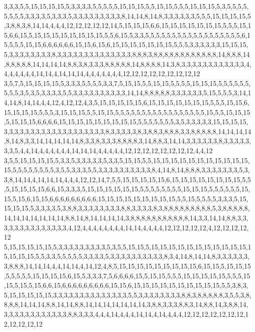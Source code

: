 3,3,3,5,5,15,15,15,15,5,3,3,3,3,5,5,5,5,5,15,15,15,5,5,15,15,5,5,5,15,15,15,5,3,5,5,5,5,5,5,5,5,3,3,3,3,5,3,3,3,5,3,3,3,3,3,3,3,3,3,8,14,14,8,14,8,3,3,3,3,3,3,5,5,5,15,15,15,15,5,3,8,8,3,8,14,14,4,4,4,12,12,12,12,12,14,5,15,15,15,6,6,15,15,15,15,15,15,15,5,5,5,15,15,6,6,15,5,15,15,15,15,15,15,15,15,5,5,6,15,5,3,3,5,5,5,5,5,5,5,5,5,5,5,5,5,5,5,5,5,5,6,15,5,5,5,15,15,6,6,6,6,6,6,15,15,6,15,6,15,15,15,15,15,15,15,5,5,5,3,3,3,3,3,3,15,15,15,5,3,3,3,3,3,3,3,3,8,3,3,3,3,3,3,3,3,3,3,3,3,3,3,8,8,8,3,8,8,8,8,8,8,8,8,8,8,8,8,14,8,8,8,14,8,8,8,8,8,14,14,14,14,8,8,3,8,3,3,3,8,8,8,8,8,14,8,8,8,8,14,3,8,3,3,3,3,3,3,3,3,3,3,3,3,4,4,4,4,4,4,4,14,14,4,14,14,14,4,4,4,4,4,4,4,12,12,12,12,12,12,12,12,12
3,5,7,5,15,15,15,15,5,3,3,3,5,5,5,5,3,3,7,5,15,15,5,5,15,15,5,5,5,5,15,15,15,5,5,5,5,5,5,5,5,5,3,5,3,5,3,3,3,3,5,5,3,3,3,3,3,3,3,3,3,3,14,14,8,8,8,8,8,3,3,3,3,3,3,5,15,5,5,5,3,14,14,14,8,14,14,4,4,12,4,12,12,4,3,5,15,15,15,15,15,6,15,15,15,15,15,15,15,5,5,5,15,15,6,15,15,15,15,5,5,5,3,15,15,15,5,5,15,15,5,5,5,5,5,5,5,5,5,5,5,5,5,5,5,5,5,15,5,5,15,15,15,5,15,15,15,6,6,6,6,15,15,15,15,15,15,15,15,15,5,5,5,5,5,5,5,3,5,3,3,3,3,3,15,15,15,15,3,3,3,3,3,3,3,3,3,3,3,3,3,3,3,3,3,3,3,8,3,3,3,3,3,8,3,8,8,3,8,8,8,3,3,8,8,8,8,8,14,14,14,14,8,14,8,3,3,14,14,14,14,14,8,3,3,8,3,3,3,8,8,8,8,3,14,8,8,3,14,14,3,3,3,3,3,3,8,3,3,3,3,3,3,3,5,4,4,14,4,4,4,4,4,4,14,14,14,4,4,4,4,4,12,12,12,12,12,12,12,12,4,4,12
3,5,5,15,15,15,15,5,3,3,5,3,3,3,3,3,5,3,3,5,15,15,5,5,15,15,15,15,15,15,15,15,15,15,15,15,5,5,5,5,5,5,5,5,3,5,5,3,3,3,5,5,3,3,3,3,3,3,3,3,3,3,8,4,14,8,14,8,8,8,3,3,3,3,3,3,3,5,3,3,8,14,14,4,14,14,14,4,4,4,12,12,14,7,5,5,15,15,15,15,15,6,15,15,15,15,15,15,15,15,5,5,5,15,15,15,15,6,6,15,3,3,3,5,15,15,15,15,15,15,5,5,5,5,5,5,5,5,15,15,15,5,5,5,5,5,5,15,15,5,15,6,15,15,6,6,6,6,6,6,6,6,6,15,15,15,15,15,15,15,15,15,5,5,15,5,5,5,5,3,3,3,5,15,15,15,15,5,3,3,3,3,5,3,8,8,3,3,3,3,3,3,3,3,8,8,3,3,3,3,8,3,8,8,8,8,8,8,8,8,8,5,3,8,8,8,8,8,14,14,14,14,14,14,14,8,8,14,8,14,14,14,14,3,8,8,8,8,8,8,8,8,8,8,8,14,3,3,14,14,8,8,3,3,3,3,3,3,3,3,3,3,3,3,3,3,4,12,4,4,4,4,4,4,4,4,14,14,4,4,4,4,12,12,12,12,12,4,12,12,12,12,12
5,15,15,15,15,15,5,3,3,3,3,3,3,3,3,3,5,3,5,5,15,15,5,15,15,15,15,15,15,15,15,15,15,15,15,15,15,15,5,5,3,3,5,5,5,5,5,3,3,3,3,5,3,3,3,3,3,3,3,3,3,3,8,3,4,14,8,14,14,8,3,3,3,3,3,3,3,8,8,8,14,14,14,4,4,14,14,4,14,12,4,8,5,15,15,15,15,15,15,15,15,15,6,15,15,5,15,15,15,5,5,5,5,5,15,15,15,15,6,15,5,3,3,3,7,5,6,6,6,6,15,5,15,15,5,5,5,15,15,15,15,15,5,5,5,15,15,5,15,5,15,6,6,15,6,6,6,6,6,6,6,6,6,15,15,6,15,15,15,15,15,15,15,15,15,15,5,5,3,8,3,5,15,15,15,15,15,3,3,3,3,3,3,3,3,3,3,3,3,3,3,5,5,3,3,3,3,3,3,3,3,8,8,3,8,8,8,8,8,3,5,5,3,8,8,8,8,14,14,14,8,8,14,14,8,8,14,14,14,14,14,14,14,3,8,8,3,3,3,8,8,3,14,8,8,14,3,8,8,14,3,3,3,3,3,3,3,3,3,3,3,3,8,8,3,3,3,4,4,4,14,4,4,4,14,14,4,14,4,4,4,12,12,12,12,12,12,12,12,12,12,12,12
